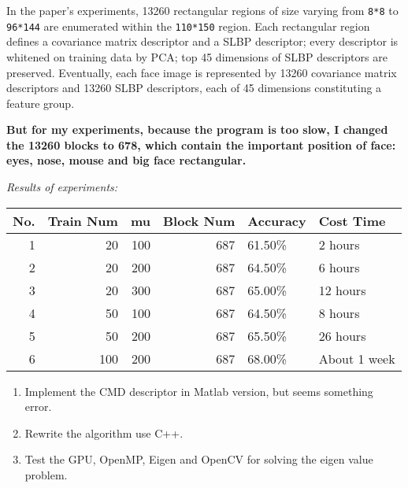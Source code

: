 \documentclass[CJK]{cctart}
\begin{document}
   In the paper's experiments, 13260 rectangular regions of size
   varying from \texttt{8*8} to \texttt{96*144} are enumerated within the \texttt{110*150}
   region. Each rectangular region defines a covariance matrix
   descriptor and a SLBP descriptor; every descriptor is whitened on
   training data by PCA; top 45 dimensions of SLBP descriptors are
   preserved. Eventually, each face image is represented by 13260
   covariance matrix descriptors and 13260 SLBP descriptors, each of
   45 dimensions constituting a feature group.
   
   \textbf{But for my experiments, because the program is too slow, I changed the 13260 blocks to 678, which contain the important    position of face: eyes, nose, mouse and big face rectangular.}

   \emph{Results of experiments:}

\begin{center}
\begin{tabular}{rrrrll}
 No.  &  Train Num  &   mu  &  Block Num  &  Accuracy  &  Cost Time     \\
\hline
   1  &         20  &  100  &        687  &  61.50\%   &  2 hours       \\
   2  &         20  &  200  &        687  &  64.50\%   &  6 hours       \\
   3  &         20  &  300  &        687  &  65.00\%   &  12 hours      \\
   4  &         50  &  100  &        687  &  64.50\%   &  8 hours       \\
   5  &         50  &  200  &        687  &  65.50\%   &  26 hours      \\
   6  &        100  &  200  &        687  &  68.00\%   &  About 1 week  \\
\end{tabular}
\end{center}



\begin{enumerate}
\item Implement the CMD descriptor in Matlab version, but seems
   something error.
\item Rewrite the algorithm use C++.
\item Test the GPU, OpenMP, Eigen and OpenCV for solving the eigen value problem.
\end{enumerate}
\end{document}
